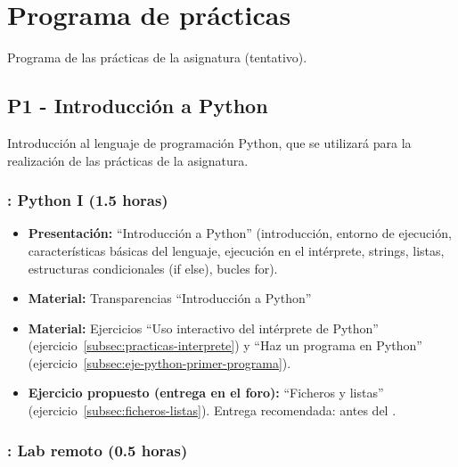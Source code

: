 \documentclass[a4paper,12pt]{article}
\begin{document}
\section{Programa de prácticas}

Programa de las prácticas de la asignatura (tentativo).

\subsection{P1 - Introducción a Python}

Introducción al lenguaje de programación Python, que se utilizará para la realización de las prácticas de la asignatura.

\subsubsection{\lunesA: Python I (1.5 horas)}
\label{cal:lunesA}

\begin{itemize}
\item \textbf{Presentación:} ``Introducción a Python'' (introducción, entorno de ejecución, características básicas del lenguaje, ejecución en el intérprete, strings, listas, estructuras condicionales (if else), bucles for).
\item \textbf{Material:} Transparencias ``Introducción a Python''
\item \textbf{Material:} Ejercicios ``Uso interactivo del intérprete de Python'' (ejercicio~\ref{subsec:practicas-interprete}) y ``Haz un programa en Python'' (ejercicio~\ref{subsec:eje-python-primer-programa}).
\item \textbf{Ejercicio propuesto (entrega en el foro):} ``Ficheros y listas'' (ejercicio~\ref{subsec:ficheros-listas}).
   Entrega recomendada: antes del \lunesB.
\end{itemize}

\subsubsection{\lunesA: Lab remoto (0.5 horas)}
\label{cal:lunesAb}
\end{document}

